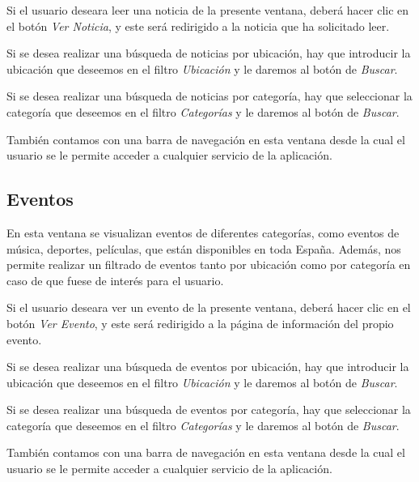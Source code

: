 Si el usuario deseara leer una noticia de la presente ventana, deberá hacer clic en el botón \textit{Ver Noticia}, y este será redirigido a la noticia que ha solicitado leer.

Si se desea realizar una búsqueda de noticias por ubicación, hay que introducir la ubicación que deseemos en el filtro \textit{Ubicación} y le daremos al botón de \textit{Buscar}.


Si se desea realizar una búsqueda de noticias por categoría, hay que seleccionar la categoría que deseemos en el filtro \textit{Categorías} y le daremos al botón de \textit{Buscar}.


También contamos con una barra de navegación en esta ventana desde la cual el usuario se le permite acceder a cualquier servicio de la aplicación.


\subsection{Eventos}


En esta ventana se visualizan eventos de diferentes categorías, como eventos de música, deportes, películas, que están disponibles en toda España. Además, nos permite realizar un filtrado de eventos tanto por ubicación como por categoría en caso de que fuese de interés para el usuario.

Si el usuario deseara ver un evento de la presente ventana, deberá hacer clic en el botón \textit{Ver Evento}, y este será redirigido a la página de información del propio evento.

Si se desea realizar una búsqueda de eventos por ubicación, hay que introducir la ubicación que deseemos en el filtro \textit{Ubicación} y le daremos al botón de \textit{Buscar}.


Si se desea realizar una búsqueda de eventos por categoría, hay que seleccionar la categoría que deseemos en el filtro \textit{Categorías} y le daremos al botón de \textit{Buscar}.


También contamos con una barra de navegación en esta ventana desde la cual el usuario se le permite acceder a cualquier servicio de la aplicación.

